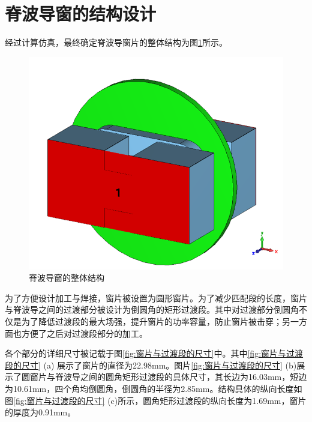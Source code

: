 \documentclass[master]{thesis-uestc}
\begin{document}
\section{脊波导窗的结构设计}
经过计算仿真，最终确定脊波导窗片的整体结构为图\ref{fig:脊波导窗的整体结构}所示。
\begin{figure}[!htb]
    \centering
    \includegraphics[width=0.45\linewidth]{pic/chapter3/输入窗的总体视图.png}
    \caption{脊波导窗的整体结构}
    \label{fig:脊波导窗的整体结构}
\end{figure}

为了方便设计加工与焊接，窗片被设置为圆形窗片。为了减少匹配段的长度，窗片与脊波导之间的过渡部分被设计为倒圆角的矩形过渡段。其中对过渡部分倒圆角不仅是为了降低过渡段的最大场强，提升窗片的功率容量，防止窗片被击穿；另一方面也方便了之后对过渡段部分的加工。

各个部分的详细尺寸被记载于图\ref{fig:窗片与过渡段的尺寸}中。其中\ref{fig:窗片与过渡段的尺寸} (a) 展示了窗片的直径为22.98mm。图片\ref{fig:窗片与过渡段的尺寸} (b)展示了圆窗片与脊波导之间的圆角矩形过渡段的具体尺寸，其长边为16.03mm，短边为10.61mm，四个角均倒圆角，倒圆角的半径为2.85mm。结构具体的纵向长度如图\ref{fig:窗片与过渡段的尺寸} (c)所示，圆角矩形过渡段的纵向长度为1.69mm，窗片的厚度为0.91mm。
\end{document}

